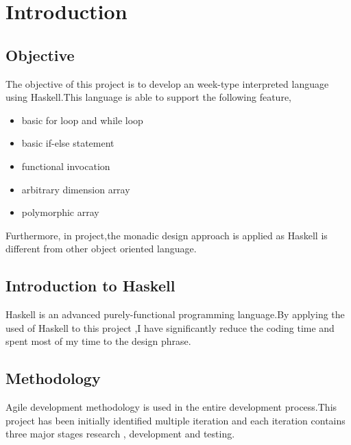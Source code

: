 \chapter{Introduction}
\section{Objective}
The objective of this project is to develop an week-type interpreted language using Haskell.This language is able to support the following feature,
\begin{itemize}
\item basic for loop and while loop
\item basic if-else statement
\item functional invocation 
\item arbitrary dimension array
\item polymorphic array
\end{itemize}

Furthermore, in project,the monadic design approach is applied as Haskell is different from other object oriented language.

\section{Introduction to Haskell} 
Haskell is an advanced purely-functional programming language.By applying the used of Haskell to this project ,I have significantly  reduce the coding time and spent most of my time to the design phrase.


\section{Methodology}
Agile development methodology is used in the entire development process.This project has been initially identified multiple iteration and each iteration contains three major stages research , development and testing.